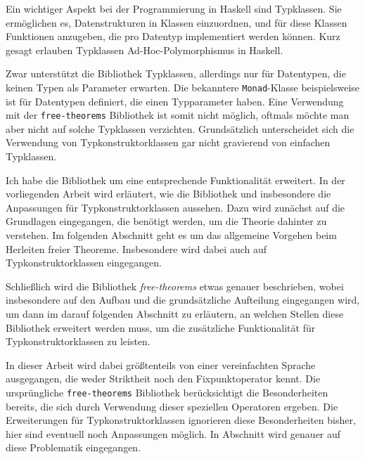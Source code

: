 Ein wichtiger Aspekt
bei der Programmierung in Haskell sind Typklassen. Sie ermöglichen es, Datenstrukturen in Klassen einzuordnen, und für diese
Klassen Funktionen anzugeben, die pro Datentyp implementiert werden können. Kurz gesagt erlauben Typklassen Ad-Hoc-Polymorphismus in Haskell.

Zwar unterstützt die Bibliothek Typklassen, allerdings nur für Datentypen, die keinen Typen als Parameter erwarten. Die
bekanntere \texttt{Monad}-Klasse beispielsweise ist für Datentypen definiert, die einen Typparameter haben. Eine Verwendung
mit der \texttt{free-theorems} Bibliothek ist somit nicht möglich, oftmals möchte man aber nicht auf solche Typklassen verzichten.
Grundsätzlich unterscheidet sich die Verwendung von Typkonstruktorklassen gar nicht gravierend von einfachen Typklassen.

Ich habe die Bibliothek um eine entsprechende Funktionalität erweitert. In der vorliegenden Arbeit wird erläutert, wie die Bibliothek
und insbesondere die Anpassungen für Typkonstruktorklassen aussehen. Dazu wird zunächst auf die Grundlagen eingegangen,
die benötigt werden, um die Theorie dahinter zu verstehen. Im folgenden Abschnitt geht es um das allgemeine Vorgehen beim
Herleiten freier Theoreme. Insbesondere wird dabei auch auf Typkonstruktorklassen eingegangen.

Schließlich wird die Bibliothek \textit{free-theorems} etwas genauer beschrieben, wobei insbesondere auf den Aufbau und die
grundsätzliche Aufteilung eingegangen wird, um dann im darauf folgenden Abschnitt zu erläutern, an welchen Stellen diese
Bibliothek erweitert werden muss, um die zusätzliche Funktionalität für Typkonstruktorklassen zu leisten.

In dieser Arbeit wird dabei größtenteils von einer vereinfachten Sprache ausgegangen, die weder Striktheit noch den Fixpunktoperator kennt.
Die ursprüngliche \texttt{free-theorems} Bibliothek berücksichtigt die Besonderheiten bereits, die sich durch Verwendung dieser
speziellen Operatoren ergeben. Die Erweiterungen für Typkonstruktorklassen ignorieren diese Besonderheiten bisher, hier
sind eventuell noch Anpassungen möglich. In Abschnitt  wird genauer auf diese Problematik eingegangen. 